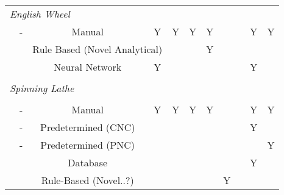 \begin{tabular}{ccccccccccc}
\multicolumn{11}{l}{\textit{English Wheel}} \\
			   & -                                                                                                               & Manual                           & Y              & Y          & Y         & Y         &               &            & Y            & Y         \\
               & \citep{Vazquez2017RoboticWheeling}                                                                              & \multicolumn{2}{l}{Rule Based (Novel Analytical)} &            &           & Y         &               &            &              &           \\
               & \citep{Rossi2018ModellingWheel, Rossi2018Re/LearningSurfaces}                                                   & Neural Network                   & Y              &            &           &           &               &            & Y            &           \\
               &                                                                                                         &                                  &                &            &           &           &               &            &              &           \\
\multicolumn{11}{l}{\textit{Spinning Lathe}} \\                                                                                                       &                                  &                &            &           &           &               &            &              &           \\
               & -                                                                                                               & Manual                           & Y              & Y          & Y         & Y         &               &            & Y            & Y         \\
               & -                                                                                                               & Predetermined (CNC)              &                &            &           &           &               &            & Y            &           \\
               & -                                                                                                               & Predetermined (PNC)              &                &            &           &           &               &            &              & Y         \\
               & \citep{Henkenjohann2005AnProcess}                                                                               & Database                         &                &            &           &           &               &            & Y            &           \\
               & \citep{Polyblank2015ParametricSpinning}                                                                         & Rule-Based (Novel..?)            &                &            &           &           & Y             &            &              &    \\
\bottomrule			   
\end{tabular}